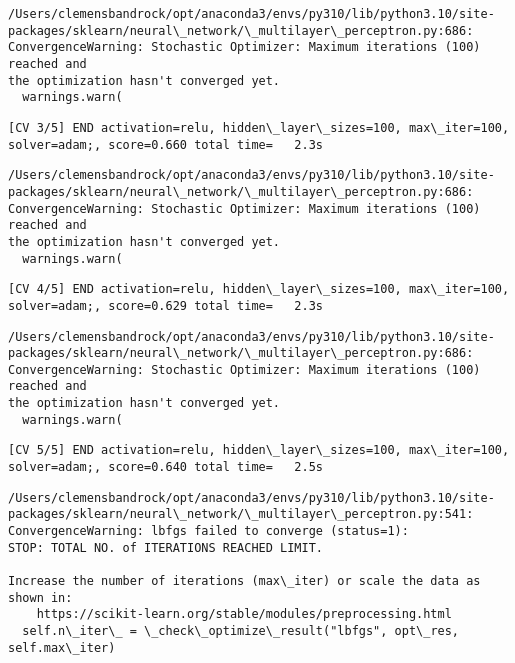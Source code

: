 \documentclass[11pt]{article}
\begin{document}
    \begin{Verbatim}[commandchars=\\\{\}]
/Users/clemensbandrock/opt/anaconda3/envs/py310/lib/python3.10/site-
packages/sklearn/neural\_network/\_multilayer\_perceptron.py:686:
ConvergenceWarning: Stochastic Optimizer: Maximum iterations (100) reached and
the optimization hasn't converged yet.
  warnings.warn(
    \end{Verbatim}

    \begin{Verbatim}[commandchars=\\\{\}]
[CV 3/5] END activation=relu, hidden\_layer\_sizes=100, max\_iter=100,
solver=adam;, score=0.660 total time=   2.3s
    \end{Verbatim}

    \begin{Verbatim}[commandchars=\\\{\}]
/Users/clemensbandrock/opt/anaconda3/envs/py310/lib/python3.10/site-
packages/sklearn/neural\_network/\_multilayer\_perceptron.py:686:
ConvergenceWarning: Stochastic Optimizer: Maximum iterations (100) reached and
the optimization hasn't converged yet.
  warnings.warn(
    \end{Verbatim}

    \begin{Verbatim}[commandchars=\\\{\}]
[CV 4/5] END activation=relu, hidden\_layer\_sizes=100, max\_iter=100,
solver=adam;, score=0.629 total time=   2.3s
    \end{Verbatim}

    \begin{Verbatim}[commandchars=\\\{\}]
/Users/clemensbandrock/opt/anaconda3/envs/py310/lib/python3.10/site-
packages/sklearn/neural\_network/\_multilayer\_perceptron.py:686:
ConvergenceWarning: Stochastic Optimizer: Maximum iterations (100) reached and
the optimization hasn't converged yet.
  warnings.warn(
    \end{Verbatim}

    \begin{Verbatim}[commandchars=\\\{\}]
[CV 5/5] END activation=relu, hidden\_layer\_sizes=100, max\_iter=100,
solver=adam;, score=0.640 total time=   2.5s
    \end{Verbatim}

    \begin{Verbatim}[commandchars=\\\{\}]
/Users/clemensbandrock/opt/anaconda3/envs/py310/lib/python3.10/site-
packages/sklearn/neural\_network/\_multilayer\_perceptron.py:541:
ConvergenceWarning: lbfgs failed to converge (status=1):
STOP: TOTAL NO. of ITERATIONS REACHED LIMIT.

Increase the number of iterations (max\_iter) or scale the data as shown in:
    https://scikit-learn.org/stable/modules/preprocessing.html
  self.n\_iter\_ = \_check\_optimize\_result("lbfgs", opt\_res, self.max\_iter)
    \end{Verbatim}
\end{document}
